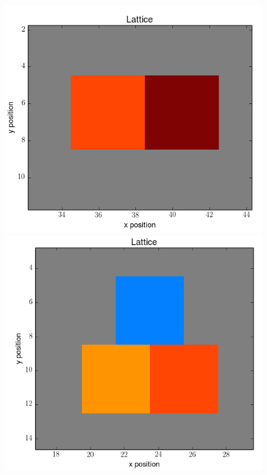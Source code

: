 \documentclass[12pt]{article}
\begin{document}
\begin{figure}[h]
	\includegraphics[scale=0.20]{img/2horz-start}
	\includegraphics[scale=0.20]{img/3ctc-start}

\end{figure}
\end{document}
